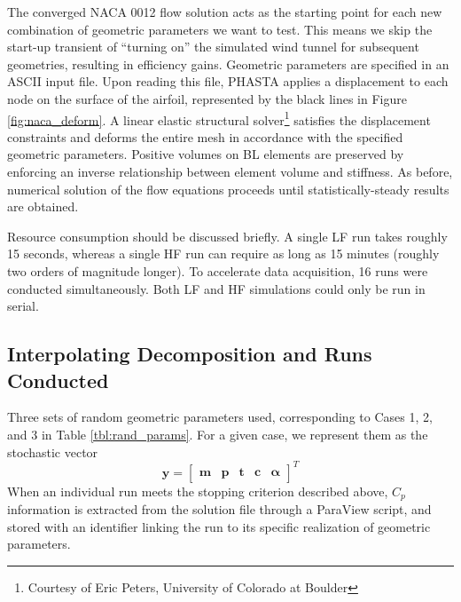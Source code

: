 \documentclass[11pt]{article}
\begin{document}
The converged NACA 0012 flow solution acts as the starting point for each new combination of geometric parameters we want to test. This means we skip the start-up transient of ``turning on'' the simulated wind tunnel for subsequent geometries, resulting in efficiency gains. Geometric parameters are specified in an ASCII input file. Upon reading this file, PHASTA applies a displacement to each node on the surface of the airfoil, represented by the black lines in Figure \ref{fig:naca_deform}. A linear elastic structural solver\footnote{Courtesy of Eric Peters, University of Colorado at Boulder} satisfies the displacement constraints and deforms the entire mesh in accordance with the specified geometric parameters. Positive volumes on BL elements are preserved by enforcing an inverse relationship between element volume and stiffness. As before, numerical solution of the flow equations proceeds until statistically-steady results are obtained.

Resource consumption should be discussed briefly. A single LF run takes roughly 15 seconds, whereas a single HF run can require as long as 15 minutes (roughly two orders of magnitude longer). To accelerate data acquisition, 16 runs were conducted simultaneously. Both LF and HF simulations could only be run in serial.

\subsection{Interpolating Decomposition and Runs Conducted}

Three sets of random geometric parameters used, corresponding to Cases 1, 2, and 3 in Table \ref{tbl:rand_params}. For a given case, we represent them as the stochastic vector
\begin{equation}
\bm{y} = \begin{bmatrix}
\bm{m} & \bm{p} & \bm{t} & \bm{c} & \bm{\alpha}
\end{bmatrix}^T
\end{equation}
When an individual run meets the stopping criterion described above, $C_p$ information is extracted from the solution file through a ParaView script, and stored with an identifier linking the run to its specific realization of geometric parameters.
\end{document}
